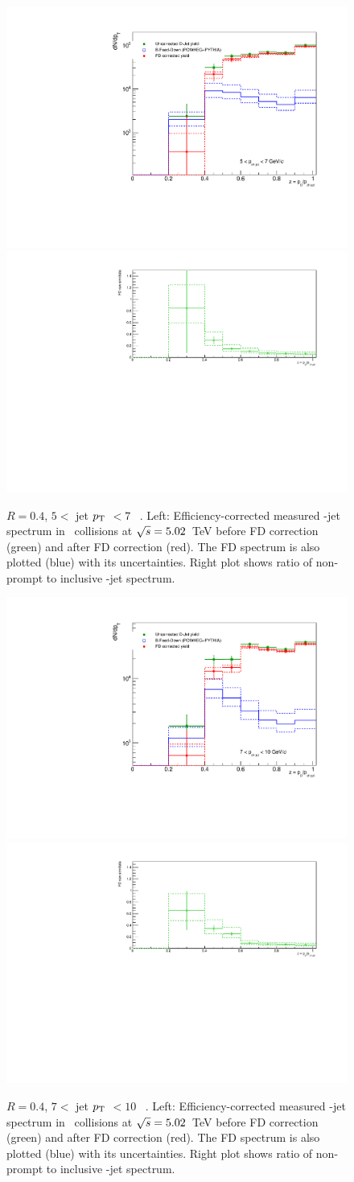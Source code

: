 \begin{figure}[bth]
\centering
\includegraphics[width=.47\textwidth]{pp_2sig/FD/R4/5_7/JetPtSpectra_FDsub}
\includegraphics[width=.522\textwidth]{pp_2sig/FD/R4/5_7/FDratio}
\caption{$R=0.4$, $5<$ jet $p_{\text T}$ $< 7$ \GeVc\ . Left: Efficiency-corrected measured \Dzero-jet spectrum in \pp\ collisions at $\sqrt{s}=5.02$~TeV before FD correction (green) and after FD correction (red). The FD spectrum is also plotted (blue) with its uncertainties. Right plot shows ratio of non-prompt to inclusive \Dzero-jet spectrum.}
\label{fig:ppFD_corr_Dzero_z5_7_R4}
\end{figure}

\begin{figure}[bth]
\centering
\includegraphics[width=.47\textwidth]{pp_2sig/FD/R4/7_10/JetPtSpectra_FDsub}
\includegraphics[width=.522\textwidth]{pp_2sig/FD/R4/7_10/FDratio}
\caption{$R=0.4$, $7<$ jet $p_{\text T}$ $<10$ \GeVc\ . Left: Efficiency-corrected measured \Dzero-jet spectrum in \pp\ collisions at $\sqrt{s}=5.02$~TeV before FD correction (green) and after FD correction (red). The FD spectrum is also plotted (blue) with its uncertainties. Right plot shows ratio of non-prompt to inclusive \Dzero-jet spectrum.}
\label{fig:ppFD_corr_Dzero_z7_10_R4}
\end{figure}

